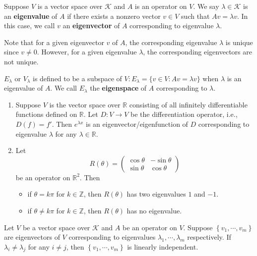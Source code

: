 \documentclass{ctexart}
\newcommand{\R}{\mathbb{R}}
\newcommand{\Z}{\mathbb{Z}}
\begin{document}
    \begin{mydef}
        Suppose $V$ is a vector space over $\mathcal{K}$ and $A$ is an operator on $V$. We say $\lambda \in \mathcal{K}$ is an \textbf{eigenvalue} of $A$ if there exists a nonzero vector $v\in V$ such that $Av = \lambda v$. In this case, we call $v$ an \textbf{eigenvector} of $A$ corresponding to eigenvalue $\lambda$.
    \end{mydef}
    \begin{myrmk}
        Note that for a given eigenvector $v$ of $A$, the corresponding eigenvalue $\lambda$ is unique since $v\neq 0$. However, for a given eigenvalue $\lambda$, the corresponding eigenvectors are not unique.
    \end{myrmk}
    \begin{mydef}
    $E_\lambda$ or $V_\lambda$ is defined to be a subspace of $V: E_\lambda = \{v\in V: Av = \lambda v\}$ when $\lambda$ is an eigenvalue of $A$. We call $E_\lambda$ the \textbf{eigenspace} of $A$ corresponding to $\lambda$.
    \end{mydef}
    \begin{myex}
        \begin{enumerate}
            \item Suppose $V$ is the vector space over $\R$ consisting of all infinitely differentiable functions defined on $\R$. Let $D:V\to V$ be the differentiation operator, i.e., $D(f) = f'$. Then $e^{\lambda x}$ is an eigenvector/eigenfunction of $D$ corresponding to eigenvalue $\lambda$ for any $\lambda \in \R$.
            \item Let
            $$ R(\theta) = \begin{pmatrix}
                \cos \theta & -\sin \theta \\
                \sin \theta & \cos \theta
            \end{pmatrix}
            $$
            be an operator on $\R^2$. Then
            \begin{itemize}
                \item if $\theta = k\pi$ for $k\in \Z$, then $R(\theta)$ has two eigenvalues $1$ and $-1$.
                \item if $\theta \neq k\pi$ for $k\in \Z$, then $R(\theta)$ has no eigenvalue.
            \end{itemize}

        \end{enumerate}
    \end{myex}
    \begin{mythm}
        Let $V$ be a vector space over $\mathcal{K}$ and $A$ be an operator on $V$. Suppose $\left\{ v_1,\cdots, v_m \right\} $ are eigenvectors of $V$ corresponding to eigenvalues $\lambda_1, \cdots, \lambda_m$ respectively. If $\lambda_i \neq \lambda_j$ for any $i\neq j$, then $\left\{ v_1,\cdots, v_m \right\} $ is linearly independent.
    \end{mythm}
\end{document}
